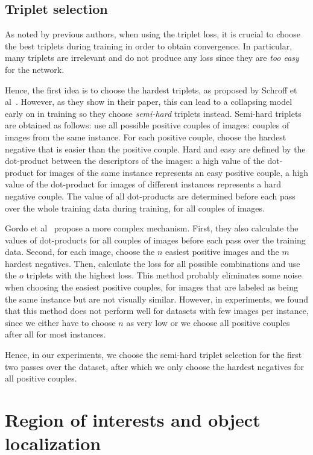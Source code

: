 \subsection{Triplet selection}
As noted by previous authors, when using the triplet loss, it is
crucial to choose the best triplets during training in order to
obtain convergence. In particular, many triplets are irrelevant
and do not produce any loss since they are \emph{too easy} for the network.

Hence, the first idea is to choose the hardest triplets, as proposed by
Schroff et al~\cite{schroff_facenet:_2015}. However, as they show in
their paper, this can lead to a collapsing model early on in training
so they choose  \emph{semi-hard} triplets instead. Semi-hard triplets
are obtained as follows:
use all possible positive couples of images: couples of images from the
same instance. For each positive couple, choose the hardest negative
that is easier than the positive couple. Hard and easy are defined
by the dot-product between the descriptors of the images: a high value
of the dot-product for images of the same instance represents an easy
positive couple, a high value of the dot-product for images of different
instances represents a hard negative couple.
The value of all dot-products are determined before each pass over
the whole training data during training, for all couples of images.

Gordo et al~\cite{gordo_end--end_2016} propose a more complex mechanism.
First, they also calculate the values of dot-products for all couples of
images before each pass over the training data.
Second, for each image, choose the $n$ easiest positive images and the
$m$ hardest negatives. Then, calculate the loss for all possible combinations
and use the $o$ triplets with the highest loss.
This method probably eliminates some noise when choosing the easiest
positive couples, for images that are labeled as being the same instance
but are not visually similar.
However, in experiments, we found that this method does not perform well
for datasets with few images per instance, since we either have to
choose $n$ as very low or we choose all positive couples after all for
most instances.

Hence, in our experiments, we choose the semi-hard triplet selection
for the first two passes over the dataset, after which we only choose
the hardest negatives for all positive couples.

\section{Region of interests and object localization}\label{sec:analysisprev}
